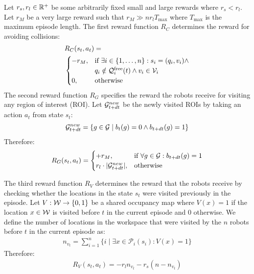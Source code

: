 \documentclass{article}
\begin{document}
Let $r_s, r_l \in \mathbb{R}^+$ be some arbitrarily fixed small and large rewards where $r_s < r_l$. Let $r_M$ be a very large reward such that $r_M \gg nr_lT_{\max} $ where $T_{\max}$ is the maximum episode length. The first reward function $R_C$ determines the reward for avoiding collisions:
\begin{align}
\label{eq:reward_c}
& R_C(s_t, a_t) = \hfill \nonumber \\
& \begin{cases}
    -r_M, &\text{if } \exists i \in \{1,\ldots,n\}: s_i = (q_i, v_i) \land \\
          & q_i \notin \config_i^{\free}(t) \land v_i \in \mathcal{V}_i \\
    0,    &\text{otherwise}
\end{cases}
\end{align}
The second reward function $R_G$ specifies the reward the robots receive for visiting any region of interest (ROI). Let $\mathcal{G}^{new}_{t+dt}$ be the newly visited ROIs by taking an action $a_t$ from state $s_t$:
\begin{equation}
    \mathcal{G}^{new}_{t+dt} = \{ g \in \mathcal{G} \mid b_t(g) = 0 \land b_{t+dt}(g) = 1 \}
\end{equation}
Therefore:
\begin{align}
R_G(s_t, a_t) = 
\begin{cases}
    +r_M, &\text{if } \forall g \in \mathcal{G}: b_{t+dt} (g) = 1 \\
    r_l \cdot |\mathcal{G}^{new}_{t+dt}|, & \text{otherwise} 
\end{cases}
\end{align}

The third reward function $R_V$ determines the reward that the robots receive by checking whether the locations in the state $s_t$ were visited previously in the episode. Let $V: {\mathcal{W}} \to \{0,1\}$ be a shared occupancy map where $V(x) = 1$ if the location $x \in \mathcal{W}$ is visited before $t$ in the current episode and 0 otherwise. We define the number of locations in the workspace that were visited by the $n$ robots before $t$ in the current episode as:
\begin{align}
n_{v_t} = \sum_{i=1}^n \{ i \mid \exists x \in \mathcal{P}_i(s_i): V(x) = 1 \}
\end{align}
Therefore:
\begin{align}
R_V(s_t, a_t) = - r_l n_{v_t} - r_s (n - n_{v_t}) \label{eq:reward_V}
\end{align}
\end{document}
